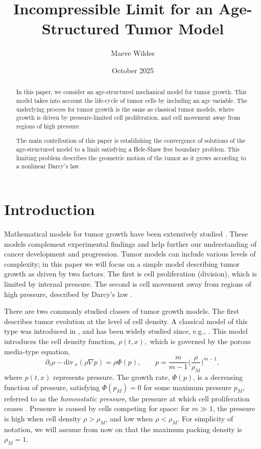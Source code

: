 \documentclass{amsart}
\title{Incompressible Limit for an Age-Structured Tumor Model}
\author{Maeve Wildes}
\date{October 2025}
\def\div{\mathrm{div}\,}
\begin{document}
\begin{abstract}
In this paper, we consider an age-structured mechanical model for tumor growth. This model takes into account the life-cycle of tumor cells by including an age variable. The underlying process for tumor growth is the same as classical tumor models, where growth is driven by pressure-limited cell proliferation, and cell movement away from regions of high pressure. 

The main contribution of this paper is establishing the convergence of solutions of the age-structured model to a limit satisfying a Hele-Shaw free boundary problem. This limiting problem describes the geometric motion of the tumor as it grows according to a nonlinear Darcy's law.

\end{abstract}
\maketitle
\section{Introduction}\label{sec:intro}
 Mathematical models for tumor growth have been extensively studied \cite{ Bellomo2008OnTF,david,Greenspan,PerthameQuiros2014}. These models complement
experimental findings and help further our understanding of cancer development and progression. Tumor
models can include various levels of complexity; in this paper we will focus on a simple model describing tumor growth as driven by two factors. The first is
cell proliferation (division), which is limited by internal pressure. The second is cell movement away from regions of high pressure, described by Darcy's law \cite{Greenspan,CL}. 

There are two commonly studied classes of tumor growth models. The first describes tumor evolution at the level of cell density. A classical model of this type was introduced in \cite{byrne}, and has been widely studied since, e.g., \cite{degond, PerthameQuiros2014,mellet2015heleshawproblemtumorgrowth}. This model introduces the cell density function, $\rho(t,x),$ which is governed by the porous media-type equation,
\begin{equation}\label{simple.tm}
\partial_t \rho-\div_x(\rho\nabla p)=\rho \Phi(p), \qquad p=\frac{m}{m-1}\Big(\frac{\rho}{\rho_M}\Big)^{m-1},
\end{equation}
where $p(t,x)$ represents pressure. The growth rate, $\Phi(p)$, is a decreasing function of pressure, satisfying $\Phi(p_M)=0$ for some maximum pressure $p_M$, referred to as the \textit{homeostatic pressure}, the pressure at which cell proliferation ceases \cite{basan09}. Pressure is caused by cells competing for space: for $m\gg 1$, the pressure is high when cell density $\rho>\rho_M$, and low when $\rho<\rho_M$. For simplicity of notation, we will assume from now on that the maximum packing density is $\rho_M=1$.
\end{document}

